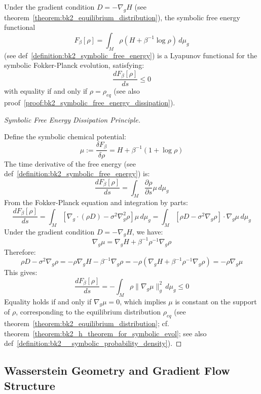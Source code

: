 \begin{theorem} 
\label{theorem:bk2_h_theorem_for_symbolic_evol} 
Under the gradient condition $D = -\nabla_g H$ (see theorem~\ref{theorem:bk2_equilibrium_distribution}), the symbolic free energy functional
\[
F_\beta[\rho] = \int_M \rho \left( H + \beta^{-1} \log \rho \right) \, d\mu_g
\]
(see def~\ref{definition:bk2_symbolic_free_energy}) is a Lyapunov functional for the symbolic Fokker-Planck evolution, satisfying:
\[
\frac{dF_\beta[\rho]}{ds} \leq 0
\]
with equality if and only if $\rho = \rho_{eq}$ (see also proof~\ref{proof:bk2_symbolic_free_energy_dissipation}).
\end{theorem}

\begin{proof}[Symbolic Free Energy Dissipation Principle]
\label{proof:bk2_symbolic_free_energy_dissipation}
\leavevmode

Define the symbolic chemical potential:
\[
\mu := \frac{\delta F_\beta}{\delta \rho} = H + \beta^{-1}(1 + \log \rho)
\]
The time derivative of the free energy (see def~\ref{definition:bk2_symbolic_free_energy}) is:
\[
\frac{dF_\beta[\rho]}{ds} = \int_M \frac{\partial \rho}{\partial s} \mu \, d\mu_g
\]
From the Fokker-Planck equation and integration by parts:
\[
\frac{dF_\beta[\rho]}{ds} = \int_M [\nabla_g \cdot (\rho D) - \sigma^2 \nabla_g^2 \rho] \mu \, d\mu_g = \int_M [\rho D - \sigma^2 \nabla_g \rho] \cdot \nabla_g \mu \, d\mu_g
\]
Under the gradient condition $D = -\nabla_g H$, we have:
\[
\nabla_g \mu = \nabla_g H + \beta^{-1} \rho^{-1} \nabla_g \rho
\]
Therefore:
\[
\rho D - \sigma^2 \nabla_g \rho = -\rho \nabla_g H - \beta^{-1} \nabla_g \rho = -\rho \left( \nabla_g H + \beta^{-1} \rho^{-1} \nabla_g \rho \right) = -\rho \nabla_g \mu
\]
This gives:
\[
\frac{dF_\beta[\rho]}{ds} = -\int_M \rho \|\nabla_g \mu\|_g^2 \, d\mu_g \leq 0
\]
Equality holds if and only if $\nabla_g \mu = 0$, which implies $\mu$ is constant on the support of $\rho$, corresponding to the equilibrium distribution $\rho_{eq}$ (see theorem~\ref{theorem:bk2_equilibrium_distribution}; cf. theorem~\ref{theorem:bk2_h_theorem_for_symbolic_evol}; see also def~\ref{definition:bk2__symbolic_probability_density}).
\end{proof}

\subsection{Wasserstein Geometry and Gradient Flow Structure}
\label{subsec:bk2_wasserstein_geometry}


